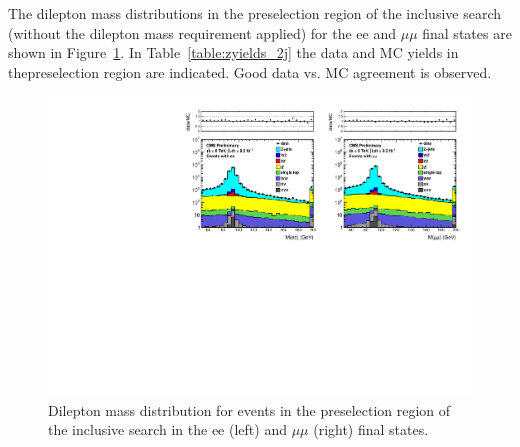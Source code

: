 The dilepton mass distributions in the preselection region of the inclusive search (without the dilepton mass requirement applied) 
for the ee and $\mu\mu$ final states are shown in Figure~\ref{fig:dilmass_2j}. In Table~\ref{table:zyields_2j} the data and MC yields 
in thepreselection region are indicated. Good data vs. MC agreement is observed.


\begin{figure}[hbt]
  \begin{center}
	\includegraphics[width=1.0\linewidth]{plots/dilmass_2jets_92fb.pdf}
	\caption{
	  \label{fig:dilmass_2j}\protect 
	  Dilepton mass distribution for events in the preselection region of the inclusive search
	  in the ee (left) and $\mu\mu$ (right) final states.}



  \end{center}
\end{figure}

